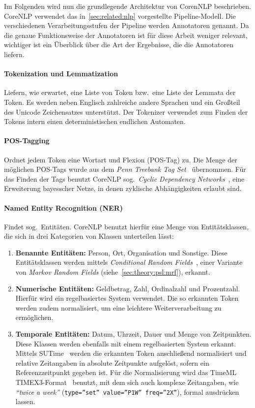 Im Folgenden wird nun die grundlegende Architektur von CorenNLP beschrieben.
CoreNLP verwendet das in~\ref{sec:related:nlp} vorgestellte Pipeline-Modell.
Die verschiedenen Verarbeitungsstufen der Pipeline werden Annotatoren genannt.
Da die genaue Funktionsweise der Annotatoren ist für diese Arbeit weniger relevant, wichtiger ist ein Überblick über die Art der Ergebnisse, die die Annotatoren liefern.

\paragraph{Tokenization und Lemmatization}
Liefern, wie erwartet, eine Liste von Token bzw.\ eine Liste der Lemmata der Token.
Es werden neben Englisch zahlreiche andere Sprachen und ein Großteil des Unicode Zeichensatzes unterstützt.
Der Tokenizer verwendet zum Finden der Tokens intern einen deterministischen endlichen Automaten.

\paragraph{POS-Tagging}
Ordnet jedem Token eine Wortart und Flexion (POS-Tag) zu.
Die Menge der möglichen POS-Tags wurde aus dem \textit{Penn Treebank Tag Set}~\cite{PennTags} übernommen.
Für das Finden der Tags benutzt CoreNLP sog.\ \textit{Cyclic Dependency Networks}~\cite{Toutanova2003}, eine Erweiterung bayesscher Netze, in denen zyklische Abhängigkeiten erlaubt sind.

\paragraph{Named Entity Recognition (NER)}
Findet sog.\ Entitäten.
CoreNLP benutzt hierfür eine Menge von Entitätsklassen, die sich in drei Kategorien von Klassen unterteilen lässt:
\begin{enumerate}
	\item \textbf{Benannte Entitäten:}
		Person, Ort, Organisation und Sonstige.
		Diese Entitätsklassen werden mittels \textit{Conditional Random Fields}~\cite{Finkel2005}, einer Variante von \textit{Markov Random Fields} (siehe~\ref{sec:theory:psl:mrf}), erkannt.
	\item \textbf{Numerische Entitäten:}
		Geldbetrag, Zahl, Ordinalzahl und Prozentzahl.
		Hierfür wird ein regelbasiertes System verwendet.
		Die so erkannten Token werden zudem normalisiert, um eine leichtere Weiterverarbeitung zu ermöglichen.
	\item \textbf{Temporale Entitäten:}
		Datum, Uhrzeit, Dauer und Menge von Zeitpunkten.
		Diese Klassen werden ebenfalls mit einem regelbasierten System erkannt.
		Mittels SUTime~\cite{Chang2012} werden die erkannten Token anschließend normalisiert und relative Zeitangaben in absolute Zeitpunkte aufgelöst, sofern ein Referenzzeitpunkt gegeben ist.
		Für die Normalisierung wird das TimeML TIMEX3-Format~\cite{TIMEX3} benutzt, mit dem sich auch komplexe Zeitangaben, wie \textit{``twice a week''} (\texttt{type=''set'' value=''P1W'' freq=''2X''}), formal ausdrücken lassen.
\end{enumerate}

